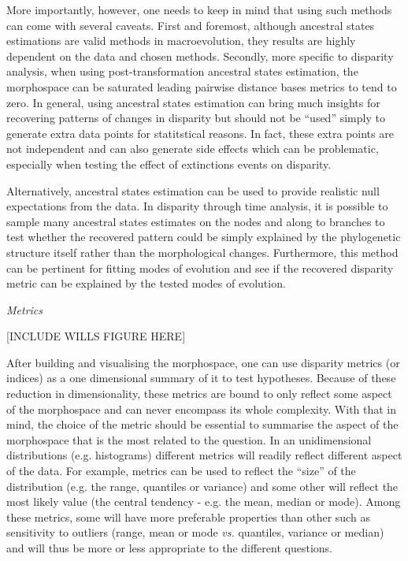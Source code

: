 \documentclass[12pt,letterpaper]{article}
\renewcommand{\subsection}[1]{%
\bigskip
\begin{center}
\begin{large}
\normalfont\itshape #1
\end{large}
\end{center}}
\begin{document}
More importantly, however, one needs to keep in mind that using such methods can come with several caveats.
First and foremost, although ancestral states estimations are valid methods in macroevolution, they results are highly dependent on the data and chosen methods.
Secondly, more specific to disparity analysis, when using post-transformation ancestral states estimation, the morphospace can be saturated leading pairwise distance bases metrics to tend to zero.
In general, using ancestral states estimation can bring much insights for recovering patterns of changes in disparity but should not be ``used'' simply to generate extra data points for statitstical reasons.
In fact, these extra points are not independent and can also generate side effects which can be problematic, especially when testing the effect of extinctions events on disparity.

Alternatively, ancestral states estimation can be used to provide realistic null expectations from the data.
In disparity through time analysis, it is possible to sample many ancestral states estimates on the nodes and along to branches to test whether the recovered pattern could be simply explained by the phylogenetic structure itself rather than the morphological changes.
Furthermore, this method can be pertinent for fitting modes of evolution and see if the recovered disparity metric can be explained by the tested modes of evolution.


\subsection{Metrics}
\label{metrics}
 
[INCLUDE WILLS FIGURE HERE]

After building and visualising the morphospace, one can use disparity metrics (or indices) as a one dimensional summary of it to test hypotheses.
Because of these reduction in dimensionality, these metrics are bound to only reflect some aspect of the morphospace and can never encompass its whole complexity.
With that in mind, the choice of the metric should be essential to summarise the aspect of the morphospace that is the most related to the question.
In an unidimensional distributions (e.g. histograms) different metrics will readily reflect different aspect of the data.
For example, metrics can be used to reflect the ``size'' of the distribution (e.g. the range, quantiles or variance) and some other will reflect the most likely value (the central tendency - e.g. the mean, median or mode).
Among these metrics, some will have more preferable properties than other such as sensitivity to outliers (range, mean or mode \textit{vs.} quantiles, variance or median) and will thus be more or less appropriate to the different questions.
\end{document}
